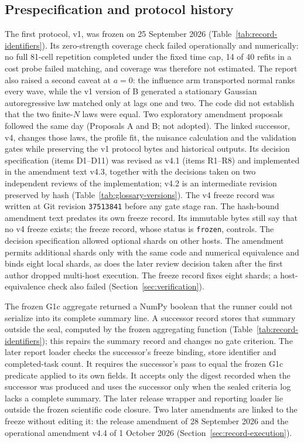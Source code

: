 \subsection{Prespecification and protocol history}\label{sec:record-history}\label{supp:protocol-lineage}

The first protocol, v1, was frozen on 25 September 2026 (Table~\ref{tab:record-identifiers}). %
Its zero-strength coverage check failed operationally and numerically: no full 81-cell repetition completed under the fixed time cap, 14 of 40 refits in a cost probe failed matching, and coverage was therefore not estimated. %
The report also raised a second caveat at $a=0$: the influence arm transported normal ranks every wave, while the v1 version of B generated a stationary Gaussian autoregressive law matched only at lags one and two. The code did not establish that the two finite-$N$ laws were equal. %
Two exploratory amendment proposals followed the same day (Proposals A and B; not adopted). The linked successor, v4, changes those laws, the profile fit, the nuisance calculation and the validation gates while preserving the v1 protocol bytes and historical outputs. %
Its decision specification (items D1--D11) was revised as v4.1 (items R1--R8) and implemented in the amendment text v4.3, together with the decisions taken on two independent reviews of the implementation; v4.2 is an intermediate revision preserved by hash (Table~\ref{tab:glossary-versions}). The v4 freeze record was written at Git revision \texttt{37513841} before any gate stage ran. %
The hash-bound amendment text predates its own freeze record. Its immutable bytes still say that no v4 freeze exists; the freeze record, whose status is \texttt{frozen}, controls. %
The decision specification allowed optional shards on other hosts. The amendment permits additional shards only with the same code and numerical equivalence and binds eight local shards, as does the later review decision taken after the first author dropped multi-host execution. The freeze record fixes eight shards; a host-equivalence check also failed (Section~\ref{sec:verification}). %

The frozen G1c aggregate returned a NumPy boolean that the runner could not serialize into its complete summary line. %
A successor record stores that summary outside the seal, computed by the frozen aggregating function (Table~\ref{tab:record-identifiers}); this repairs the summary record and changes no gate criterion. %
The later report loader checks the successor's freeze binding, store identifier and completed-task count. It requires the successor's pass to equal the frozen G1c predicate applied to its own fields. It accepts only the digest recorded when the successor was produced and uses the successor only when the sealed criteria log lacks a complete summary. %
The later release wrapper and reporting loader lie outside the frozen scientific code closure. Two later amendments are linked to the freeze without editing it: the release amendment of 28 September 2026 and the operational amendment v4.4 of 1 October 2026 (Section~\ref{sec:record-execution}). %

